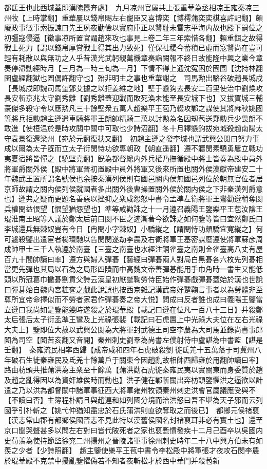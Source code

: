 都氐王也此西城蓋即漢隗囂奔處】　九月凉州官屬共上張重華為丞相凉王雍秦凉三州牧【上時掌翻】重華屢以錢帛賜左右寵臣又喜博奕【博樗蒲奕奕棋喜許記翻】頗廢政事徵事索振諫曰先王夙夜勤儉以實府庫正以讐耻未雪志平海内故也殿下嗣位之初彊寇侵逼【徵事凉所置官謂趙來攻也事見上卷二年三年索惜各翻】賴重餌之故得戰士死力【謂以錢帛厚賞戰士得其出力致死】僅保社稷今蓄積已虛而寇讐尚在豈可輕有耗散以與無功之人乎昔漢光武躬親萬機章奏詣闕報不終日故能隆中興之業今章奏停滯動經時月【三月為一時三旬為一月】下情不得上通沈寃困於囹圄【沈持林翻囹盧經翻獄也圄偶許翻守也】殆非明主之事也重華謝之　司馬勲出駱谷破趙長城戍【長城戍即魏司馬望鄧艾據之以拒姜維之地】壁于懸鉤去長安二百里使治中劉煥攻長安斬京兆太守劉秀離【劉秀離蓋迎戰而敗死渙未能至長安城下也】又拔賀城三輔豪傑多殺守令以應勲凡三十餘壁衆五萬人趙樂平王苞乃輟攻鄴之謀使其將麻秋姚國等將兵拒勲趙主遵遣車騎將軍王朗帥精騎二萬以討勲為名因刼苞送鄴勲兵少畏朗不敢進【使桓温於是時攻關中關中可取也少詩沼翻】冬十月釋懸鉤拔宛城殺趙南陽太守袁景復還梁州【宛於元翻復扶又翻】　初趙主遵之發李城也謂武興公閔曰努力事成以爾為太子旣而立太子衍閔恃功欲專朝政【朝直遥翻】遵不聼閔素驍勇屢立戰功夷夏宿將皆憚之【驍堅堯翻】旣為都督總内外兵權乃撫循殿中將士皆奏為殿中員外將軍爵關外侯【殿中將軍晉初置殿中員外將軍又後來所置也關外侯漢獻帝建安二十年魏武王置所謂名號侯也余按秦漢列侯則有國邑關内侯無國邑列位於朝無官位者居京師故謂之關内侯列侯就國者多出關外後曹操置關外侯於關内侯之下非秦漢列爵意也】遵弗之疑而更題名善惡以挫抑之衆咸怨怒中書令孟準左衛將軍王鸞勸遵稍奪閔兵權閔益恨望【恨望猶怨望也】準等咸勸誅之十一月遵召義陽王鑒樂平王苞汝陰王琨淮南王昭等入議於鄭太后前曰閔不臣之迹漸著今欲誅之如何鑒等皆曰宜然鄭氏曰李城還兵無棘奴豈有今日【冉閔小字棘奴】小驕縱之【謂閔恃功頗驕宜寛縱之】何可遽殺鑒出遣宦者楊環馳以告閔閔遂劫李農及右衛將軍王基密謀廢遵使將軍蘇彦周成帥甲士三千人執遵於南臺【三臺之南臺也水經注銅雀臺之南則金雀臺高八丈有屋百九十間帥讀曰率】遵方與婦人彈碁【藝經曰彈碁兩人對局白黑碁各六枚先列碁相當更先彈也其局以石為之局形四隤而中高魏文帝善彈碁能用手巾角時一書生又能低頭以所冠葛巾撇碁劉貢父詩云漢皇初厭蹵鞠勞侍臣始作彈碁戲彈碁蓋始於漢也世說曰彈碁始自魏内宮粧奩之戲此說誤也按西京雜記漢武帝好蹵鞠言事者以為勞體非至尊所宜帝命擇似而不勞者家君作彈碁奏之帝大悦】問成曰反者誰也成曰義陽王鑒當立遵曰我尚如是鑒能幾時遂殺之於琨華殿【載記曰遵在位凡一百八十三日】并殺鄭太后張后太子衍孟準王鸞及上光祿張裴【載記曰石虎置上中光祿大夫位在左右光祿大夫上】鑒即位大赦以武興公閔為大將軍封武德王司空李農為大司馬並錄尚書事郎闓為司空【闓苦亥翻又音開】秦州刺史劉羣為尚書左僕射侍中盧諶為中書監【諶是壬翻】　秦雍流民相率西歸【成帝咸和四年石虎破殺劉徙氐羌十五萬落于司冀州八年破石生徙秦雍民及氐羌十餘萬戶于關東今因趙亂故相帥西歸雍於用翻帥讀曰率】路由枋頭共推蒲洪為主衆至十餘萬【蒲洪勸石虎徙秦雍民夷以實關東而身委質於趙及趙之亂得因以為資奸雄俟時而動也】洪子健在鄴斬關出奔枋頭鑒懼洪之逼欲以計遣之乃以洪為都督關中諸軍事征西大將軍雍州牧領秦州刺史洪會官屬議應受與不【不讀曰否】主簿程朴請且與趙連和如列國分境而治洪怒曰吾不堪為天子邪而云列國乎引朴斬之【姚弋仲猶知盡忠於石氏蒲洪則直欲奪取之而後已】　都鄉元侯禇裒【漢志常山郡有都鄉侯國晉志不見此特以漢舊侯國名封禇裒耳非必有實土也】還至京口聞哭聲甚多以問左右對曰皆代陂死者之家也裒慙憤發疾十二月己酉卒以吳國内史荀羨為使持節監徐兖二州揚州之晉陵諸軍事徐州刺史時年二十八中興方伯未有如羨之少者【少詩照翻】　趙主鑒使樂平王苞中書令李松殿中將軍張才夜攻石閔李農於琨華殿不克禁中擾亂鑒懼偽若不知者夜斬松才於西中華門并殺苞新